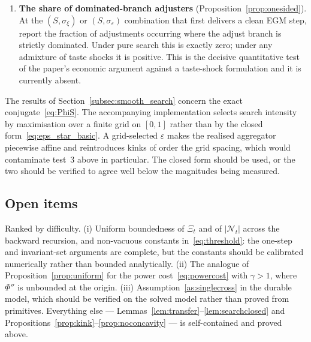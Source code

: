 \begin{enumerate}
    \item \textbf{The share of dominated-branch adjusters}
    (Proposition~\ref{prop:onesided}). At the $(S,\sigma_\xi)$ or
    $(S,\sigma_\varepsilon)$ combination that first delivers a clean EGM step, report the
    fraction of adjustments occurring where the adjust branch is strictly dominated.
    Under pure search this is exactly zero; under any admixture of taste shocks it is
    positive. This is the decisive quantitative test of the paper's economic argument
    against a taste-shock formulation and it is currently absent.
\end{enumerate}

\begin{remark}
\label{rem:implementation}
The results of Section~\ref{subsec:smooth_search} concern the exact
conjugate~\eqref{eq:PhiS}. The accompanying implementation selects search intensity by
maximisation over a finite grid on $[0,1]$ rather than by the closed
form~\eqref{eq:eps_star_basic}. A grid-selected $\varepsilon$ makes the realised
aggregator piecewise affine and reintroduces kinks of order the grid spacing, which
would contaminate test~3 above in particular. The closed form should be used, or the
two should be verified to agree well below the magnitudes being measured.
\end{remark}

\subsection{Open items}
\label{subsec:smooth_open}

Ranked by difficulty. (i) Uniform boundedness of $\Xi_t$ and of $|\mathcal{N}_t|$ across
the backward recursion, and non-vacuous constants in~\eqref{eq:threshold}: the one-step
and invariant-set arguments are complete, but the constants should be calibrated
numerically rather than bounded analytically. (ii) The analogue of
Proposition~\ref{prop:uniform} for the power cost~\eqref{eq:powercost} with $\gamma>1$,
where $\Phi''$ is unbounded at the origin. (iii)
Assumption~\ref{as:singlecross} in the durable model, which should be verified on the
solved model rather than proved from primitives. Everything else ---
Lemmas~\ref{lem:transfer}--\ref{lem:searchclosed} and
Propositions~\ref{prop:kink}--\ref{prop:noconcavity} --- is self-contained and proved
above.

